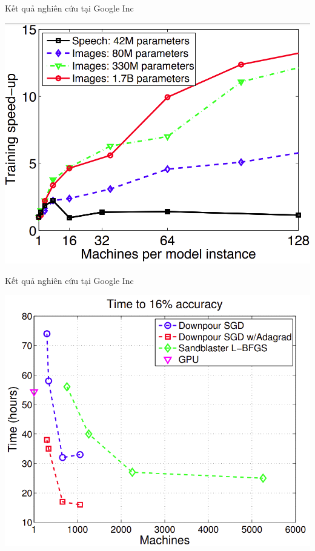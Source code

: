 \documentclass[notheorems,hyperref={bookmarks=true}]{beamer}
\theoremstyle{plain}
\numberwithin{equation}{section}
\begin{document}
\begin{footnotesize}
\begin{frame}{Kết quả nghiên cứu tại Google Inc}
\begin{center}
	\includegraphics[scale=0.45]{GG_1.PNG}
\end{center}
\end{frame}

\begin{frame}{Kết quả nghiên cứu tại Google Inc}
\begin{center}
	\includegraphics[scale=0.45]{GG_4.PNG}
\end{center}
\end{frame}


\end{footnotesize}
\end{document}

